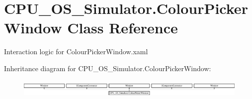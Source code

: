 \hypertarget{class_c_p_u___o_s___simulator_1_1_colour_picker_window}{}\section{C\+P\+U\+\_\+\+O\+S\+\_\+\+Simulator.\+Colour\+Picker\+Window Class Reference}
\label{class_c_p_u___o_s___simulator_1_1_colour_picker_window}


Interaction logic for Colour\+Picker\+Window.\+xaml  


Inheritance diagram for C\+P\+U\+\_\+\+O\+S\+\_\+\+Simulator.\+Colour\+Picker\+Window\+:\begin{figure}[H]
\begin{center}
\leavevmode
\includegraphics[height=0.892430cm]{class_c_p_u___o_s___simulator_1_1_colour_picker_window}
\end{center}
\end{figure}
